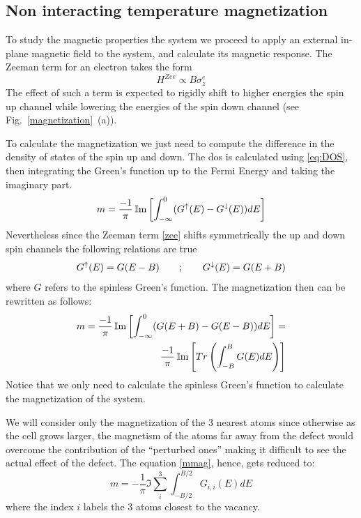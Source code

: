\subsection{Non interacting temperature magnetization}
To study the magnetic properties the system we proceed to apply an external in-plane magnetic field to the system, and calculate its magnetic response. The Zeeman term for an electron takes the form
\begin{equation}
  H^{Zee} \propto B\sigma^e_{z}
\label{zee}
\end{equation}
The effect of such a term is expected to rigidly shift to higher energies the spin up channel while lowering the energies of the spin down channel (see Fig.~\ref{magnetization}~(a)).

To calculate the magnetization we just need to compute the difference in the density of states of the spin up and down. The \ac{dos} is calculated using \eqref{eq:DOS}, then integrating the Green's function up to the Fermi Energy and taking the imaginary part.
\begin{equation}
  m = \frac{-1}{\pi}
      \operatorname{\mathbb{I}m}\left[\int^{0}_{-\infty} (G^{\uparrow}(E)-G^{\downarrow}(E))dE\right]
\end{equation}
Nevertheless since the Zeeman term \eqref{zee} shifts symmetrically the up and down spin channels the following relations are true
\begin{equation}
  G^{\uparrow}(E) = G(E-B) \quad\quad;\quad\quad G^{\downarrow}(E) = G(E+B)
\end{equation}
where $G$ refers to the spinless Green's function. The magnetization then can be rewritten as follows:
\begin{equation}
  \begin{split}
      m = \frac{-1}{\pi}\operatorname{\mathbb{I}m}\left[\int^{0}_{-\infty}(G(E+B)-G(E -B))dE\right] =\\
      \frac{-1}{\pi} \operatorname{\mathbb{I}m}\left[Tr\left(\int^{B}_{-B}G(E)dE\right)\right]
  \end{split}
\label{mmag}
\end{equation}
Notice that we only need to calculate the spinless Green's function to calculate the magnetization of the system.

We will consider only the magnetization of the 3 nearest atoms since otherwise as the cell grows larger, the magnetism of the atoms far away from the defect would overcome the contribution of the ``perturbed ones'' making it difficult to see the actual effect of the defect. The equation \eqref{mmag}, hence, gets reduced to:
\begin{equation}
  m = -\frac{1}{\pi}
      \Im{\sum^{3}_{i}\int^{B/2}_{-B/2}G_{i,i}(E)dE}
\label{mag}
\end{equation}
where the index $i$ labels the 3 atoms closest to the vacancy.

